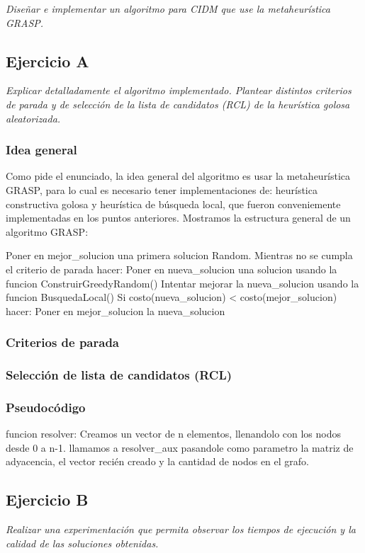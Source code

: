 \textit{Diseñar e implementar un algoritmo para CIDM que use la metaheurística GRASP.}

\subsection{Ejercicio A}

\textit{Explicar detalladamente el algoritmo implementado. Plantear distintos criterios de parada y de selección de la lista de candidatos (RCL) de la heurística golosa aleatorizada.}

\medskip

\subsubsection{Idea general}

Como pide el enunciado, la idea general del algoritmo es usar la metaheurística GRASP, para lo cual es necesario tener implementaciones de: heurística constructiva golosa y heurística de búsqueda local, que fueron conveniemente implementadas en los puntos anteriores.
Mostramos la estructura general de un algoritmo GRASP:

\begin{codesnippet}
Poner en mejor_solucion una primera solucion Random.
Mientras no se cumpla el criterio de parada hacer:
    Poner en nueva_solucion una solucion usando la funcion ConstruirGreedyRandom()
    Intentar mejorar la nueva_solucion usando la funcion BusquedaLocal()
    Si costo(nueva_solucion) < costo(mejor_solucion) hacer:
        Poner en mejor_solucion la nueva_solucion
\end{codesnippet}

\subsubsection{Criterios de parada}

\subsubsection{Selección de lista de candidatos (RCL)}

\subsubsection{Pseudocódigo}
\begin{codesnippet}
funcion resolver:
    Creamos un vector de n elementos, llenandolo con los nodos desde 0 a n-1.
    llamamos a resolver_aux pasandole como parametro la matriz de adyacencia, el vector
        recién creado y la cantidad de nodos en el grafo.
\end{codesnippet}

\subsection{Ejercicio B}

\textit{Realizar una experimentación que permita observar los tiempos de ejecución y la calidad de las soluciones obtenidas.}
\medskip
